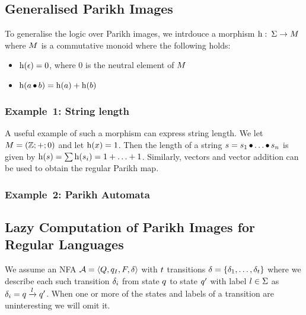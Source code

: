 \documentclass{easychair}
\theoremstyle{definition}
\begin{document}

\subsection{Generalised Parikh Images}\label{sec:generalised}

To generalise the logic over Parikh images, we intrdouce a morphism $\operatorname{h}:\: \Sigma
\to M$ where $M$ is a commutative monoid where the following holds:
\begin{itemize}
  \item $\operatorname{h}(\epsilon) = 0$, where $0$ is the neutral element of $M$
  \item $\operatorname{h}(a \operatorname{\bullet} b) = \operatorname{h}(a) + \operatorname{h}(b)$
\end{itemize}

\subsubsection{Example~1: String length}

A useful example of such a morphism can express string length. We let $M =
\left(\mathbb{Z};+;0\right)$ and let $\operatorname{h}(x) = 1$. Then the length of a string $s
= s_1 \operatorname{\bullet} \ldots \operatorname{\bullet}  s_n$ is given by $\operatorname{h}(s) = \sum \operatorname{h}(s_i) = 1
+ \ldots + 1$. Similarly, vectors and vector addition can be used to obtain
the regular Parikh map.


\subsubsection{Example~2: Parikh Automata}


\subsection{Lazy Computation of Parikh Images for Regular Languages}

We assume an NFA $\mathcal{A} = \left\langle Q, q_I, F, \delta\right\rangle$ with $t$
transitions $\delta =
\left\{\delta_{1} , \ldots , \delta_{t}\right\}$ where we describe each
such transition $\delta_i$ from state $q$ to state $q'$ with
label $l \in \Sigma$ as $\delta_i =
q \xrightarrow{l} q'$. When one or more of the states and
labels of a transition are uninteresting we will omit it.
\end{document}
